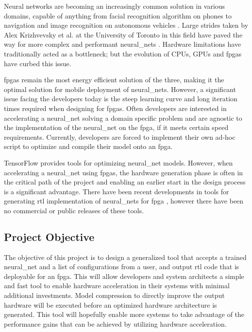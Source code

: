 \documentclass{uw-ece-wkrpt}
\begin{document}
Neural networks are becoming an increasingly common solution in various domains, capable of anything from facial recognition algorithm on phones \cite{Stoimenov2016Face-recognitio} to navigation and image recognition on autonomous vehicles \cite{Ucar2017Object-recognit}. Large strides taken by Alex Krizhvevsky et al. at the University of Toronto in this field have paved the way for more complex and performant \glspl{neural_net} \cite{Krizhevsky2017ImageNet-Classi}. Hardware limitations have traditionally acted as a bottleneck; but the evolution of CPUs, GPUs and \glspl{fpga} have curbed this issue.

\glspl{fpga} remain the most energy efficient solution of the three, making it the optimal solution for mobile deployment of \glspl{neural_net}. However, a significant issue facing the developers today is the steep learning curve and long iteration times required when designing for \glspl{fpga}. Often developers are interested in accelerating a \gls{neural_net} solving a domain specific problem and are agnostic to the implementation of the \gls{neural_net} on the \gls{fpga}, if it meets certain speed requirements. Currently, developers are forced to implement their own ad-hoc script to optimize and compile their model onto an \gls{fpga}.

TensorFlow provides tools for optimizing \gls{neural_net} models. However, when accelerating a \gls{neural_net} using \gls{fpga}s, the hardware generation phase is often in the critical path of the project and enabling an earlier start in the design process is a significant advantage. There have been recent developments in tools for generating \gls{rtl} implementation of \glspl{neural_net} for \gls{fpga} \cite{Ma2017An-automatic-RT}, however there have been no commercial or public releases of these tools.

\subsection{Project Objective}

The objective of this project is to design a generalized tool that accepts a trained \gls{neural_net} and a list of configurations from a user, and output \gls{rtl} code that is deployable for an \gls{fpga}. This will allow developers and system architects a simple and fast tool to enable hardware acceleration in their systems with minimal additional investments. Model compression to directly improve the output hardware will be executed before an optimized hardware architecture is generated. This tool will hopefully enable more systems to take advantage of the performance gains that can be achieved by utilizing hardware acceleration.
\end{document}
